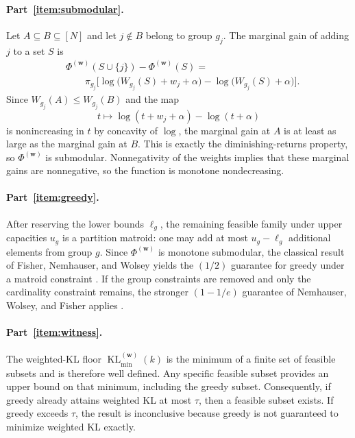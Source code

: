 \documentclass[10pt,journal]{IEEEtran}
\newcommand{\1}{\mathbf{1}}
\newcommand{\bw}{\mathbf{w}}
\DeclareMathOperator{\KL}{KL}
\theoremstyle{ieeethm}
\begin{document}
\paragraph{Part~\ref{item:submodular}.}
Let $A\subseteq B\subseteq[N]$ and let $j\notin B$ belong to group $g_j$. The marginal gain of adding $j$ to a set $S$ is
\begin{equation*}
\begin{aligned}
&\Phi^{(\bw)}(S\cup\{j\})-\Phi^{(\bw)}(S)
=\\
&\qquad \pi_{g_j}\Big[\log\big(W_{g_j}(S)+w_j+\alpha\big)-\log\big(W_{g_j}(S)+\alpha\big)\Big].
\end{aligned}
\end{equation*}
Since $W_{g_j}(A)\le W_{g_j}(B)$ and the map
\[
t\mapsto \log(t+w_j+\alpha)-\log(t+\alpha)
\]
is nonincreasing in $t$ by concavity of $\log$, the marginal gain at $A$ is at least as large as the marginal gain at $B$. This is exactly the diminishing-returns property, so $\Phi^{(\bw)}$ is submodular. Nonnegativity of the weights implies that these marginal gains are nonnegative, so the function is monotone nondecreasing.

\paragraph{Part~\ref{item:greedy}.}
After reserving the lower bounds $\ell_g$, the remaining feasible family under upper capacities $u_g$ is a partition matroid: one may add at most $u_g-\ell_g$ additional elements from group $g$. Since $\Phi^{(\bw)}$ is monotone submodular, the classical result of Fisher, Nemhauser, and Wolsey yields the $(1/2)$ guarantee for greedy under a matroid constraint \cite{fisher1978submodular}. If the group constraints are removed and only the cardinality constraint remains, the stronger $(1-1/e)$ guarantee of Nemhauser, Wolsey, and Fisher applies \cite{nemhauser1978submodular}.

\paragraph{Part~\ref{item:witness}.}
The weighted-KL floor $\KL_{\min}^{(\bw)}(k)$ is the minimum of a finite set of feasible subsets and is therefore well defined. Any specific feasible subset provides an upper bound on that minimum, including the greedy subset. Consequently, if greedy already attains weighted KL at most $\tau$, then a feasible subset exists. If greedy exceeds $\tau$, the result is inconclusive because greedy is not guaranteed to minimize weighted KL exactly.
\end{document}
